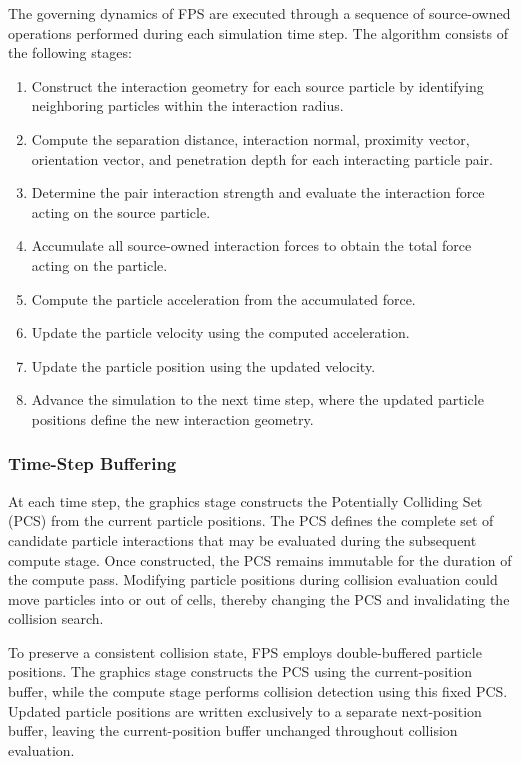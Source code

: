 The governing dynamics of FPS are executed through a
sequence of source-owned operations performed during
each simulation time step. The algorithm consists of
the following stages:

\begin{enumerate}
\item Construct the interaction geometry for each
source particle by identifying neighboring particles
within the interaction radius.

\item Compute the separation distance, interaction
normal, proximity vector, orientation vector, and
penetration depth for each interacting particle pair.

\item Determine the pair interaction strength and
evaluate the interaction force acting on the source
particle.

\item Accumulate all source-owned interaction forces
to obtain the total force acting on the particle.

\item Compute the particle acceleration from the
accumulated force.

\item Update the particle velocity using the computed
acceleration.

\item Update the particle position using the updated
velocity.

\item Advance the simulation to the next time step,
where the updated particle positions define the new
interaction geometry.
\end{enumerate}


\subsubsection{Time-Step Buffering}

At each time step, the graphics stage constructs the
Potentially Colliding Set (PCS) from the current particle
positions. The PCS defines the complete set of candidate
particle interactions that may be evaluated during the
subsequent compute stage. Once constructed, the PCS
remains immutable for the duration of the compute pass.
Modifying particle positions during collision evaluation
could move particles into or out of cells, thereby
changing the PCS and invalidating the collision search.

To preserve a consistent collision state, FPS employs
double-buffered particle positions. The graphics stage
constructs the PCS using the current-position buffer,
while the compute stage performs collision detection
using this fixed PCS. Updated particle positions are
written exclusively to a separate next-position buffer,
leaving the current-position buffer unchanged throughout
collision evaluation.

